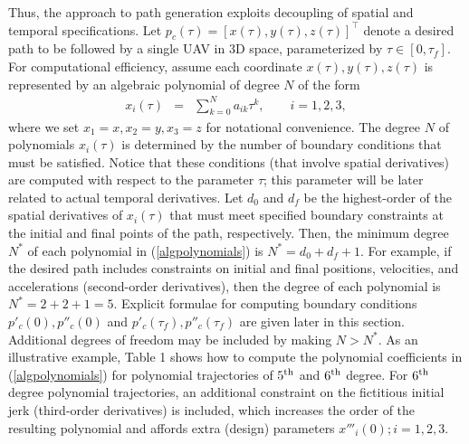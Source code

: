 \documentclass[]{aiaa-tc}%
\begin{document}
Thus, the approach to path generation exploits decoupling of spatial and temporal
specifications. Let $p_c(\tau) = [x(\tau), y(\tau), z(\tau)]^{\top}$ denote a desired
path to be followed by a single UAV in 3D space, parameterized by $\tau \in [0,
\tau_f]$. For computational efficiency, assume each coordinate $x (\tau), y(\tau),
z(\tau)$ is represented by an algebraic polynomial of degree $N$ of the form
\begin{eqnarray} \label{algpolynomials}
x_{i}(\tau) &=& \sum_{k = 0}^{N} a_{ik} \tau^k, \qquad i = 1,2,3,
\end{eqnarray}
where we set $x_{1} = x, x_{2} = y, x_{3} = z$ for notational convenience. The degree
$N$ of polynomials $x_{i}(\tau)$ is determined by the number of boundary conditions
that must be satisfied. Notice that these conditions (that involve spatial derivatives)
are computed with respect to the parameter $\tau$; this parameter will be later related
to actual temporal derivatives. Let $d_0$ and $d_f$ be the highest-order of the spatial
derivatives of $x_{i}(\tau)$ that must meet specified boundary constraints at the
initial and final points of the path, respectively. Then, the minimum degree $N^*$ of
each polynomial in (\ref{algpolynomials}) is $N^{*} = d_0 + d_f + 1$. For example, if
the desired path includes constraints on initial and final positions, velocities, and
accelerations (second-order derivatives), then the degree of each polynomial is $N^{*}
= 2 + 2 + 1 = 5$. Explicit formulae for computing boundary conditions $p'_c(0),
p''_c(0)$ and $p'_c(\tau_f), p''_c(\tau_f)$ are given later in this section. Additional
degrees of freedom may be included by making $N > N^*$. As an illustrative example,
Table 1 shows how to compute the polynomial coefficients in (\ref{algpolynomials}) for
polynomial trajectories of $5^{{\rm th}}$ and $6^{{\rm th}}$ degree. For $6^{{\rm th}}$
degree polynomial trajectories,  an additional constraint on the fictitious initial
jerk (third-order derivatives) is included, which increases the order of the resulting
polynomial and affords extra (design) parameters $ x'''_{i}(0); i = 1,2,3$.

\end{document}
